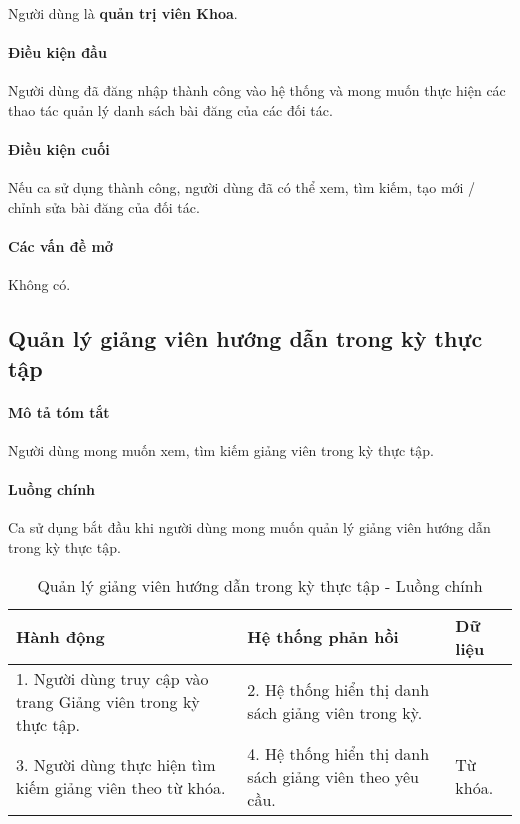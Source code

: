 \documentclass[./../main.tex]{subfiles}
\begin{document}
Người dùng là \textbf{quản trị viên Khoa}.

\paragraph*{Điều kiện đầu}

Người dùng đã đăng nhập thành công vào hệ thống và mong muốn thực hiện các thao tác quản lý danh sách bài đăng của các đối tác.

\paragraph*{Điều kiện cuối}

Nếu ca sử dụng thành công, người dùng đã có thể xem, tìm kiếm, tạo mới / chỉnh sửa bài đăng của đối tác.

\paragraph*{Các vấn đề mở}

Không có.

\subsection{Quản lý giảng viên hướng dẫn trong kỳ thực tập}

\paragraph*{Mô tả tóm tắt}

Người dùng mong muốn xem, tìm kiếm giảng viên trong kỳ thực tập.

\paragraph*{Luồng chính} Ca sử dụng bắt đầu khi người dùng mong muốn quản lý giảng viên hướng dẫn trong kỳ thực tập.

\begin{table}[H]
  \caption{Quản lý giảng viên hướng dẫn trong kỳ thực tập - Luồng chính}
  \label{tab:orgAdmin_manage_internship_lecturers}
  \begin{tabularx}{\textwidth}{|X|X|X|}
    \hline
\textbf{Hành động} & \textbf{Hệ thống phản hồi} & \textbf{Dữ liệu} \\ \hline
1. Người dùng truy cập vào trang Giảng viên trong kỳ thực tập. & 2. Hệ thống hiển thị danh sách giảng viên trong kỳ. &  \\ \hline
3. Người dùng thực hiện tìm kiếm giảng viên theo từ khóa. & 4. Hệ thống hiển thị danh sách giảng viên theo yêu cầu. & Từ khóa. \\ \hline
  \end{tabularx}
\end{table}
\end{document}
